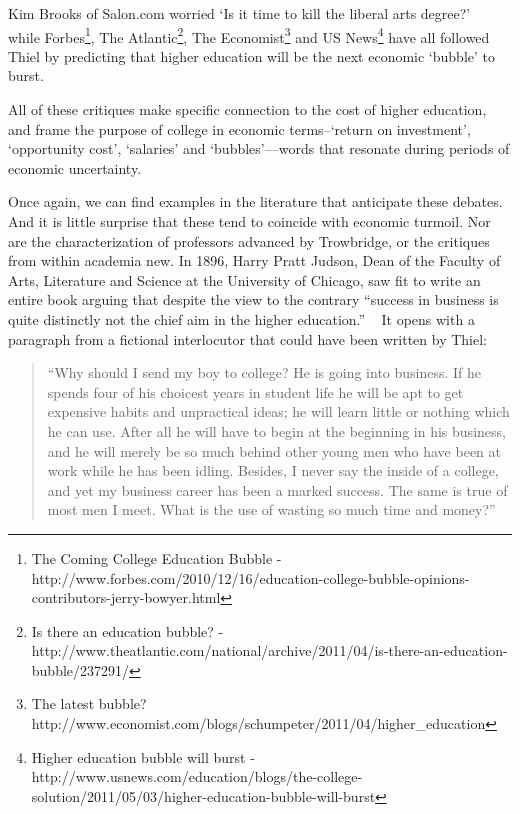 Kim Brooks of Salon.com worried `Is it time to kill the liberal arts degree?' ~\citep{Brooks:2011tb} while Forbes\footnote{The Coming College Education Bubble - http:\slash \slash www.forbes.com\slash 2010\slash 12\slash 16\slash education-college-bubble-opinions-contributors-jerry-bowyer.html}, The Atlantic\footnote{Is there an education bubble? - http:\slash \slash www.theatlantic.com\slash national\slash archive\slash 2011\slash 04\slash is-there-an-education-bubble\slash 237291\slash }, The Economist\footnote{The latest bubble? http:\slash \slash www.economist.com\slash blogs\slash schumpeter\slash 2011\slash 04\slash higher\_education} and US News\footnote{Higher education bubble will burst - http:\slash \slash www.usnews.com\slash education\slash blogs\slash the-college-solution\slash 2011\slash 05\slash 03\slash higher-education-bubble-will-burst} have all followed Thiel by predicting that higher education will be the next economic `bubble' to burst. 

All of these critiques make specific connection to the cost of higher education, and frame the purpose of college in economic terms--`return on investment', `opportunity cost', `salaries' and `bubbles'---words that resonate during periods of economic uncertainty.

Once again, we can find examples in the literature that anticipate these debates. And it is little surprise that these tend to coincide with economic turmoil. Nor are the characterization of professors advanced by Trowbridge, or the critiques from within academia new. In 1896, Harry Pratt Judson, Dean of the Faculty of Arts, Literature and Science at the University of Chicago, saw fit to write an entire book arguing that despite the view to the contrary ``success in business is quite distinctly not the chief aim in the higher education.'' ~\citep[p. 11]{Judson:1896ve} It opens with a paragraph from a fictional interlocutor that could have been written by Thiel:

\begin{quote}

``Why should I send my boy to college? He is going into business. If he spends four of his choicest years in student life he will be apt to get expensive habits and unpractical ideas; he will learn little or nothing which he can use. After all he will have to begin at the beginning in his business, and he will merely be so much behind other young men who have been at work while he has been idling. Besides, I never say the inside of a college, and yet my business career has been a marked success. The same is true of most men I meet. What is the use of wasting so much time and money?''
\end{quote}


